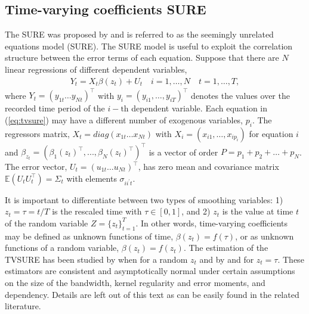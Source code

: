 \subsection{Time-varying coefficients SURE} \label{sec:sure}
The SURE was proposed by \citet{Zellner1962} and is referred to as the seemingly unrelated equations model (SURE). The SURE model is useful to exploit the correlation structure between the error terms of each equation. Suppose that there are $N$ linear regressions of different dependent variables,
\begin{eqnarray}
\label{eq:tvsure} Y_{t} = X_t \beta(z_t)+U_{t} \quad
i=1,\ldots,N\quad t=1,\ldots ,T,
\end{eqnarray}
where $Y_{t}=(y_{1t}\ldots y_{Nt})^\top$ with $y_{i} = (y_{i1}, \ldots, y_{iT})^\top$ denotes the values over the recorded time period of the $i-\mbox{th}$ dependent variable. Each equation in (\ref{eq:tvsure}) may have a different number of exogenous variables, $p_{i}$. The regressors matrix,  $X_t=diag(x_{1t}\ldots x_{Nt})$ with $X_{i}=( x_{i1},\ldots,x_{ip_{i}})$ for equation $i$ and $\beta_{z_t}=( \beta_{1}(z_t)^\top,...,\beta_{N}(z_t)^\top)^\top$ is a vector of order $P = p_1+p_2+ \ldots+p_N$. The error vector, $U_{t}=(u_{1t}\ldots u_{Nt})^\top$,  has zero mean and  covariance matrix $\mathbb{E}(U_tU^\top_t)=\Sigma_t$ with elements $\sigma_{ii^\prime t}$.

It is important to differentiate between two types of smoothing variables: 1) $z_t = \tau = t/T$ is the rescaled time with $\tau \in [0, 1]$, and 2) $z_t$ is the value at time $t$ of the random variable $Z = \{z_t\}_{t=1}^T$. In other words, time-varying coefficients may be defined as unknown functions of time, $\beta(z_t)= f(\tau)$, or as unknown functions of a random variable, $\beta(z_t) = f(z_t)$. The estimation of the TVSURE has been studied by \citet{Hendersonetal2015} when for a random $z_t$ and by \citet{Orbeetal2005} and \citet{Casasetal2019a} for $z_t = \tau$. These estimators are consistent and asymptotically normal under certain assumptions on the size of the bandwidth, kernel regularity and error moments, and dependency. Details are left out of this text as can be easily found in the related literature.

